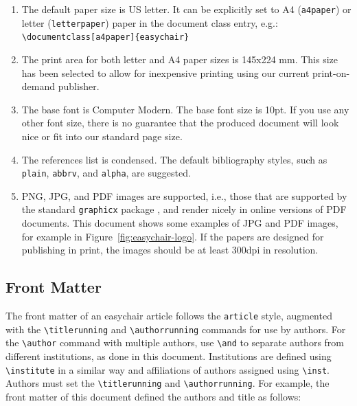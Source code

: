 \documentclass{easychair}
\newcommand{\easychair}{\textsf{easychair}}
\begin{document}
\begin{enumerate}
\item
The default paper size is US letter. It can be explicitly set to A4 
(\texttt{a4paper}) or letter (\texttt{letterpaper}) paper in the
document class entry, e.g.:\\\verb+\documentclass[a4paper]{easychair}+

\item
The print area for both letter and A4 paper sizes is 145x224 mm. This size
has been selected to allow for inexpensive printing using our current
print-on-demand publisher.

\item
The base font is Computer Modern. The base font size is 10pt. If you
use any other font size, there is no guarantee that the produced
document will look nice or fit into our standard page size.

\item
The references list is condensed. The default bibliography styles, such as
\texttt{plain}, \texttt{abbrv}, and \texttt{alpha}, are suggested.

\item
PNG, JPG, and PDF images are supported, i.e., those that are supported
by the standard \texttt{graphicx} package \cite{graphicx-package}, and
render nicely in online versions of PDF documents.  This document
shows some examples of JPG and PDF images, for example in
Figure~\ref{fig:easychair-logo}. If the papers are designed for
publishing in print, the images should be at least 300dpi in
resolution. 

\end{enumerate}

\subsection{Front Matter}
\label{sect:front-matter}

The front matter of an {\easychair} article follows the \texttt{article}
style, augmented with the \verb+\titlerunning+ and \verb+\authorrunning+
commands for use by authors. 
For the \verb+\author+ command with multiple authors, use \verb+\and+ to
separate authors from different institutions, as done in this document.
Institutions are defined using \verb+\institute+ in a similar way and affiliations of authors assigned using \verb+\inst+.
Authors must set the \verb+\titlerunning+ and \verb+\authorrunning+.
For example, the front matter of this document defined the authors
and title as follows:
\end{document}

